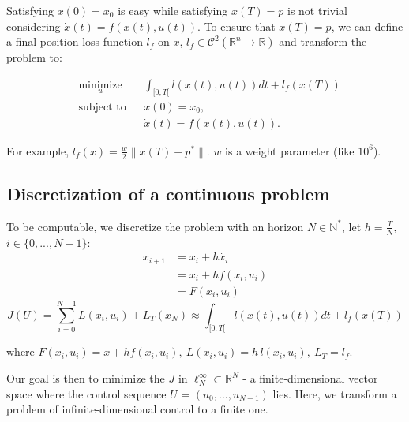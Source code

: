 \documentclass{report}
\begin{document}
Satisfying $x(0) = x_0$ is easy while satisfying $x(T) = p$ is not trivial considering $\dot{x} (t) = f(x(t), u(t))$. To ensure that $x(T)= p$, we can define a final position loss function $l_f$ on $x$, $l_f \in \mathscr{C}^2(\mathbb{R}^n \to \mathbb{R})$ and transform the problem to: 

\begin{equation}
\label{eq:problem}
\begin{aligned}
& \underset{u}{\text{minimize}}
& & \int_{[0,T[} l(x(t),u(t)) dt + l_f(x(T)) \\
& \text{subject to}
& & x(0) = x_0,  \\
&&& \dot{x} (t) = f(x(t), u(t)).
\end{aligned}
\end{equation}
     
     For example, $l_f(x) = \frac{w}{2} \|x(T) - p^*\|$. $w$ is a weight parameter (like $10^6$).
     
     
\subsection{Discretization of a continuous problem}
To be computable, we discretize the problem with an horizon $N \in \mathbb{N}^*$, let $h=\frac{T}{N}$, $i\in \{0, ..., N-1\}$:
\begin{align*}
    x_{i+1} &= x_i + h \dot{x_i}  \\
            &= x_i + h f(x_i, u_i)  \\
            &= F(x_i, u_i)
\end{align*}
\begin{equation}
J(U) = \sum_{i = 0}^{N-1} L(x_i, u_i) + L_T(x_N) \approx \int_{[0,T[} l(x(t),u(t)) dt + l_f(x(T))
\end{equation}

where $F(x_i, u_i) = x + h f(x_i, u_i), \ L(x_i, u_i) =h\,l(x_i, u_i), \ L_T = l_f $.

\medskip

Our goal is then to minimize the $J$ in $\ell_N^\infty \subset \mathbb{R}^N$ - a finite-dimensional vector space where the control sequence $U$ = $(u_0, ..., u_{N-1})$ lies. Here, we transform a problem of infinite-dimensional control to a finite one.
\end{document}
